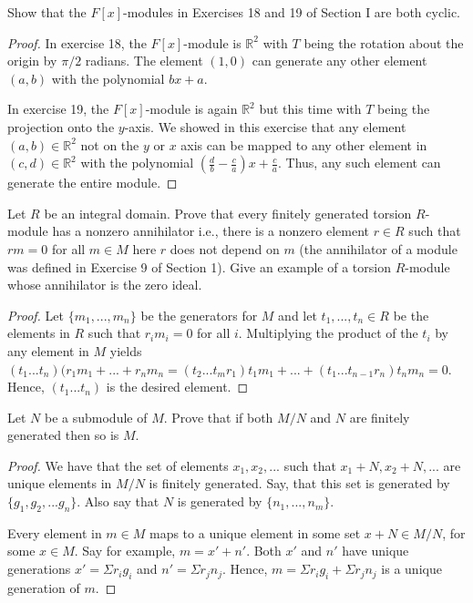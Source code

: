 \documentclass[10pt]{article}
\newcommand{\R}{\mathbb{R}}
\newenvironment{problem}[2][Problem]{\begin{trivlist}
		\item[\hskip \labelsep {\bfseries #1}\hskip \labelsep {\bfseries #2.}]}{\end{trivlist}}
\begin{document}
	\begin{problem}{3.3}
		Show that the $F[x]$-modules in Exercises 18 and 19 of Section I are both cyclic.
		\begin{proof}
			In exercise 18, the $F[x]$-module is $\R^2$ with $T$ being the rotation about the origin by $\pi/2$ radians. The element $(1,0)$ can generate any other element $(a,b)$ with the polynomial $bx + a$. 
			
			In exercise 19, the $F[x]$-module is again $\R^2$ but this time with $T$ being the projection onto the $y$-axis. We showed in this exercise that any element $(a,b) \in \R^2$ not on the $y$ or $x$ axis can be mapped to any other element in $(c,d) \in \R^2$ with the polynomial $(\frac{d}{b} - \frac{c}{a})x + \frac{c}{a}$. Thus, any such element can generate the entire module.
		\end{proof}
	\end{problem}
	
	\begin{problem}{3.5}
		Let $R$ be an integral domain. Prove that every finitely generated torsion $R$-module has a
		nonzero annihilator i.e., there is a nonzero element $r \in R$ such that $rm = 0$ for all $m \in M$ here $r$ does not depend on $m$ (the annihilator of a module was defined in Exercise 9 of Section 1). Give an example of a torsion $R$-module whose annihilator is the zero ideal.
		\begin{proof}
			Let $\{m_1, ..., m_n\}$ be the generators for $M$ and let $t_1, ..., t_n \in R$ be the elements in $R$ such that $r_im_i=0$ for all $i$. Multiplying the product of the $t_i$ by any element in $M$ yields $(t_1...t_n)(r_1m_1 + ... + r_nm_n = (t_2...t_mr_1)t_1m_1 + ... + (t_1...t_{n-1}r_n)t_nm_n = 0$. Hence, $(t_1...t_n)$ is the desired element.
		\end{proof}
	\end{problem}
	
	\begin{problem}{3.7}
		Let $N$ be a submodule of $M$. Prove that if both $M/N$ and $N$ are finitely generated then so
		is $M$.
		\begin{proof}
			We have that the set of elements $x_1, x_2, ...$ such that $x_1 +N, x_2 + N, ...$ are unique elements in $M/N$ is finitely generated. Say, that this set is generated by $\{g_1, g_2, ... g_n\}$. Also say that $N$ is generated by $\{n_1, ... , n_m\}$. 
			
			Every element in $m \in M$ maps to a unique element in some set $x+N \in M/N$, for some $x \in M$. Say for example, $m = x' + n'$. Both $x'$ and $n'$ have unique generations $x' = \Sigma r_ig_i$ and $n' = \Sigma r_j n_j$. Hence, $m = \Sigma r_ig_i + \Sigma r_j n_j$ is a unique generation of $m$.
		\end{proof}
	\end{problem}
	
\end{document}
